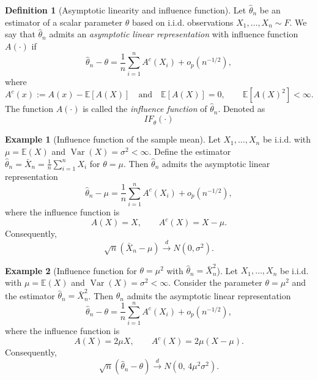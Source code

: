 \documentclass[11pt]{article}
\theoremstyle{definition}
\newtheorem{defn}{Definition}[section]
\newtheorem{exmp}{Example}[section]
\begin{document}
\begin{defn}[Asymptotic linearity and influence function]
Let $\hat\theta_n$ be an estimator of a scalar parameter $\theta$ based on i.i.d. observations
$X_1,\dots,X_n \sim F$. We say that $\hat\theta_n$ admits an \emph{asymptotic linear representation}
with influence function $A(\cdot)$ if
\[
\hat\theta_n - \theta
=
\frac{1}{n}\sum_{i=1}^n A^c(X_i) + o_p(n^{-1/2}),
\]
where
\[
A^c(x) := A(x) - \mathbb{E}[A(X)]
\quad \text{and} \quad
\mathbb{E}\!\left[A(X)\right] = 0,
\qquad
\mathbb{E}\!\left[A(X)^2\right] < \infty.
\]
The function $A(\cdot)$ is called the \emph{influence function} of $\hat\theta_n$. Denoted as
$$
IF_{\hat{\theta}}(\cdot)
$$
\end{defn}

\begin{exmp}[Influence function of the sample mean]
Let $X_1,\dots,X_n$ be i.i.d. with $\mu=\mathbb{E}(X)$ and $\operatorname{Var}(X)=\sigma^2<\infty$.
Define the estimator $\hat\theta_n=\bar X_n=\frac{1}{n}\sum_{i=1}^n X_i$ for $\theta=\mu$.
Then $\hat\theta_n$ admits the asymptotic linear representation
\[
\hat\theta_n - \mu
=
\frac{1}{n}\sum_{i=1}^n A^c(X_i) + o_p(n^{-1/2}),
\]
where the influence function is
\[
A(X)=X,
\qquad
A^c(X)=X-\mu.
\]
Consequently,
\[
\sqrt{n}(\bar X_n - \mu)
\xrightarrow{d}
N(0,\sigma^2).
\]
\end{exmp}

\begin{exmp}[Influence function for $\theta=\mu^2$ with $\hat\theta_n=\bar X_n^2$]
Let $X_1,\dots,X_n$ be i.i.d. with $\mu=\mathbb{E}(X)$ and $\operatorname{Var}(X)=\sigma^2<\infty$.
Consider the parameter $\theta=\mu^2$ and the estimator $\hat\theta_n=\bar X_n^2$.
Then $\hat\theta_n$ admits the asymptotic linear representation
\[
\hat\theta_n - \theta
=
\frac{1}{n}\sum_{i=1}^n A^c(X_i) + o_p(n^{-1/2}),
\]
where the influence function is
\[
A(X) = 2\mu X,
\qquad
A^c(X) = 2\mu(X-\mu).
\]
Consequently,
\[
\sqrt{n}(\hat\theta_n - \theta)
\xrightarrow{d}
N\!\left(0,\, 4\mu^2 \sigma^2\right).
\]
\end{exmp}
\end{document}
